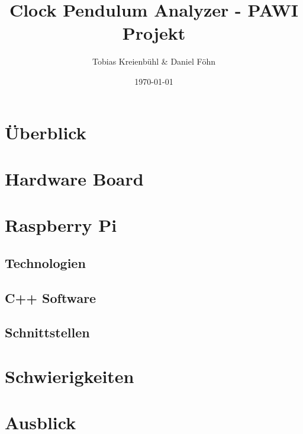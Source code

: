 \documentclass{beamer}
\title{Clock Pendulum Analyzer - PAWI Projekt}
\author{Tobias Kreienbühl \& Daniel Föhn}
\institute{Hochschule Luzern, Informatik}
\date{\today}
\begin{document}
\begin{frame}
	\titlepage
\end{frame}

\section{Überblick}
\begin{frame}

\end{frame}

\section{Hardware Board}
\begin{frame}

\end{frame}

\section{Raspberry Pi}
\begin{frame}

\end{frame}

\subsection{Technologien}
\begin{frame}

\end{frame}

\subsection{C++ Software}
\begin{frame}

\end{frame}

\subsection{Schnittstellen}
\begin{frame}

\end{frame}

\section{Schwierigkeiten}
\begin{frame}
	
\end{frame}

\section{Ausblick}
\begin{frame}

\end{frame}
\end{document}
